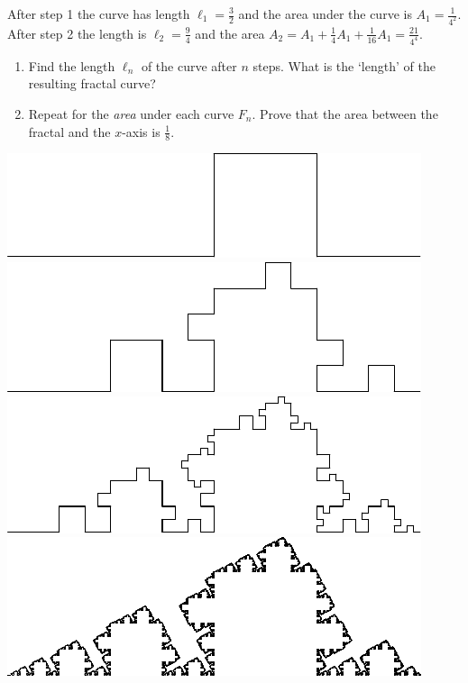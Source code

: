 \begin{exercises}{}{}
\begin{enumerate}
\begin{enumerate}
\begin{minipage}[t]{0.62\linewidth}
	    After step 1 the curve has length $\ell_1=\frac 32$ and the area under the curve is $A_1=\frac 1{4^2}$. After step 2 the length is $\ell_2=\frac 94$ and the area $A_2=A_1+\frac 14A_1+\frac 1{16}A_1 =\frac{21}{4^4}$. 
	    \begin{enumerate}\itemsep0pt
	      \item Find the length $\ell_n$ of the curve after $n$ steps. What is the `length' of the resulting fractal curve?
	      \item Repeat for the \emph{area} under each curve $F_n$. Prove that the area between the fractal and the $x$-axis is $\frac 18$.
	    \end{enumerate}
	    \end{minipage}
	    \hfill
	    \begin{minipage}[t]{0.35\linewidth}\vspace{-25pt}
	    \flushright
	    	\includegraphics[scale=0.64]{fractal1}
	    	\\
	    	\includegraphics[scale=0.64]{fractal2}
	    	\\
	    	\includegraphics[scale=0.64]{fractal3}
	    	\\
	    	\includegraphics[scale=0.64]{fractal}
	    \end{minipage}
		\end{enumerate}
		
	\end{enumerate}

\end{exercises}
	
